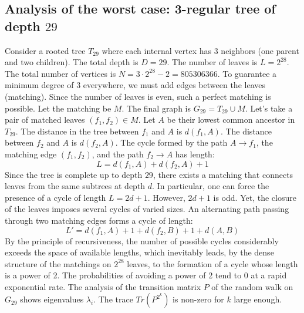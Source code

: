\documentclass[12pt,a4paper]{article}
\begin{document}
\subsection{Analysis of the worst case: 3-regular tree of depth $29$}
Consider a rooted tree $T_{29}$ where each internal vertex has 3 neighbors (one parent and two children).
The total depth is $D = 29$.
The number of leaves is $L = 2^{28}$.
The total number of vertices is $N = 3 \cdot 2^{28} - 2 = 805306366$.
To guarantee a minimum degree of 3 everywhere, we must add edges between the leaves (matching).
Since the number of leaves is even, such a perfect matching is possible.
Let the matching be $M$. The final graph is $G_{29} = T_{29} \cup M$.
Let's take a pair of matched leaves $(f_1, f_2) \in M$.
Let $A$ be their lowest common ancestor in $T_{29}$.
The distance in the tree between $f_1$ and $A$ is $d(f_1, A)$.
The distance between $f_2$ and $A$ is $d(f_2, A)$.
The cycle formed by the path $A \to f_1$, the matching edge $(f_1, f_2)$, and the path $f_2 \to A$ has length:
$$ L = d(f_1, A) + d(f_2, A) + 1 $$
Since the tree is complete up to depth $29$, there exists a matching that connects leaves from the same subtrees at depth $d$.
In particular, one can force the presence of a cycle of length $L = 2d + 1$. However, $2d+1$ is odd.
Yet, the closure of the leaves imposes several cycles of varied sizes. An alternating path passing through two matching edges forms a cycle of length:
$$ L' = d(f_1, A) + 1 + d(f_2, B) + 1 + d(A, B) $$
By the principle of recursiveness, the number of possible cycles considerably exceeds the space of available lengths, which inevitably leads, by the dense structure of the matchings on $2^{28}$ leaves, to the formation of a cycle whose length is a power of 2. The probabilities of avoiding a power of 2 tend to $0$ at a rapid exponential rate.
The analysis of the transition matrix $P$ of the random walk on $G_{29}$ shows eigenvalues $\lambda_i$. The trace $Tr(P^{2^k})$ is non-zero for $k$ large enough.
\end{document}
